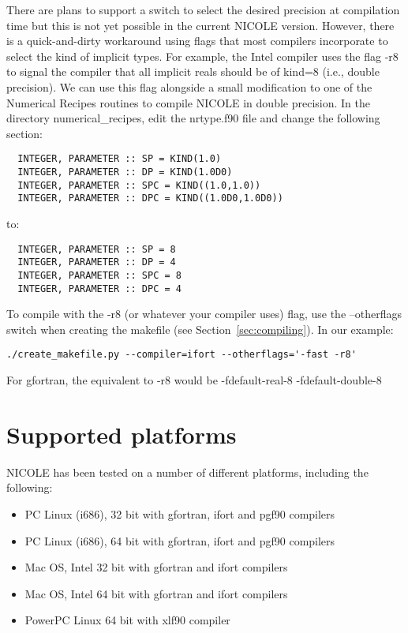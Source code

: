 There are plans to support a switch to select the desired precision
at compilation time but this is not yet possible in the current 
NICOLE version. However, there is a quick-and-dirty workaround using 
flags that most compilers incorporate to select the kind of implicit 
types. For example, the Intel compiler uses the flag -r8 to signal
the compiler that all implicit reals should be of kind=8 (i.e., double
precision). We can use this flag alongside a small modification to one
of the Numerical Recipes routines to compile NICOLE in double precision.
In the directory numerical\_recipes, edit the nrtype.f90 file and
change the following section:
\begin{verbatim}
  INTEGER, PARAMETER :: SP = KIND(1.0)
  INTEGER, PARAMETER :: DP = KIND(1.0D0)
  INTEGER, PARAMETER :: SPC = KIND((1.0,1.0))
  INTEGER, PARAMETER :: DPC = KIND((1.0D0,1.0D0))
\end{verbatim}
to:
\begin{verbatim}
  INTEGER, PARAMETER :: SP = 8
  INTEGER, PARAMETER :: DP = 4
  INTEGER, PARAMETER :: SPC = 8
  INTEGER, PARAMETER :: DPC = 4
\end{verbatim}

To compile with the -r8 (or whatever your compiler uses) flag, use the
--otherflags switch when creating the makefile (see 
Section~\ref{sec:compiling}). In our example:
\begin{verbatim}
./create_makefile.py --compiler=ifort --otherflags='-fast -r8'
\end{verbatim}
For gfortran, the equivalent to -r8 would be -fdefault-real-8 -fdefault-double-8 

\section{Supported platforms}

NICOLE has been tested on a number of different platforms, including
the following:

\begin{itemize}
\item PC Linux (i686), 32 bit with gfortran, ifort and pgf90 compilers
\item PC Linux (i686), 64 bit with gfortran, ifort and pgf90 compilers
\item Mac OS, Intel 32 bit with gfortran and ifort compilers
\item Mac OS, Intel 64 bit with gfortran and ifort compilers
\item PowerPC Linux 64 bit with xlf90 compiler
\end{itemize}


